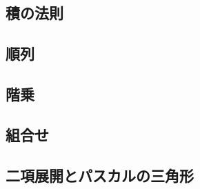 \documentclass[../../math-imaging]{subfiles}
\begin{document}
\subsection{積の法則}

\subsection{順列}

\subsection{階乗}

\subsection{組合せ}

\subsection{二項展開とパスカルの三角形}
\end{document}
